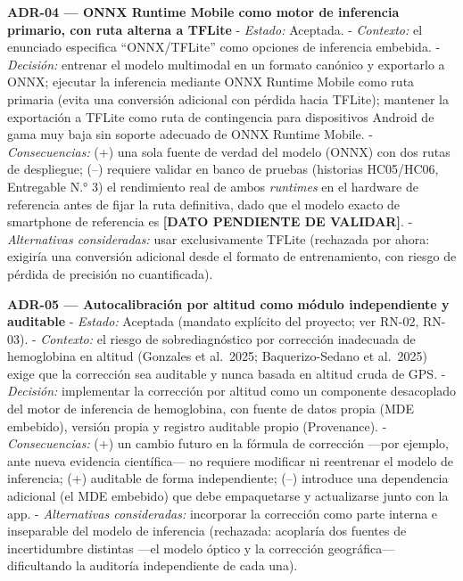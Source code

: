 \documentclass[11pt,a4paper]{article}
\begin{document}
\textbf{ADR-04 --- ONNX Runtime Mobile como motor de inferencia primario, con ruta alterna a TFLite}
- \emph{Estado:} Aceptada.
- \emph{Contexto:} el enunciado especifica ``ONNX/TFLite'' como opciones de inferencia embebida.
- \emph{Decisión:} entrenar el modelo multimodal en un formato canónico y exportarlo a ONNX; ejecutar la inferencia mediante ONNX Runtime Mobile como ruta primaria (evita una conversión adicional con pérdida hacia TFLite); mantener la exportación a TFLite como ruta de contingencia para dispositivos Android de gama muy baja sin soporte adecuado de ONNX Runtime Mobile.
- \emph{Consecuencias:} (+) una sola fuente de verdad del modelo (ONNX) con dos rutas de despliegue; (--) requiere validar en banco de pruebas (historias HC05/HC06, Entregable N.° 3) el rendimiento real de ambos \emph{runtimes} en el hardware de referencia antes de fijar la ruta definitiva, dado que el modelo exacto de smartphone de referencia es \textbf{{[}DATO PENDIENTE DE VALIDAR{]}}.
- \emph{Alternativas consideradas:} usar exclusivamente TFLite (rechazada por ahora: exigiría una conversión adicional desde el formato de entrenamiento, con riesgo de pérdida de precisión no cuantificada).

\textbf{ADR-05 --- Autocalibración por altitud como módulo independiente y auditable}
- \emph{Estado:} Aceptada (mandato explícito del proyecto; ver RN-02, RN-03).
- \emph{Contexto:} el riesgo de sobrediagnóstico por corrección inadecuada de hemoglobina en altitud (Gonzales et al.~2025; Baquerizo-Sedano et al.~2025) exige que la corrección sea auditable y nunca basada en altitud cruda de GPS.
- \emph{Decisión:} implementar la corrección por altitud como un componente desacoplado del motor de inferencia de hemoglobina, con fuente de datos propia (MDE embebido), versión propia y registro auditable propio (Provenance).
- \emph{Consecuencias:} (+) un cambio futuro en la fórmula de corrección ---por ejemplo, ante nueva evidencia científica--- no requiere modificar ni reentrenar el modelo de inferencia; (+) auditable de forma independiente; (--) introduce una dependencia adicional (el MDE embebido) que debe empaquetarse y actualizarse junto con la app.
- \emph{Alternativas consideradas:} incorporar la corrección como parte interna e inseparable del modelo de inferencia (rechazada: acoplaría dos fuentes de incertidumbre distintas ---el modelo óptico y la corrección geográfica--- dificultando la auditoría independiente de cada una).
\end{document}
